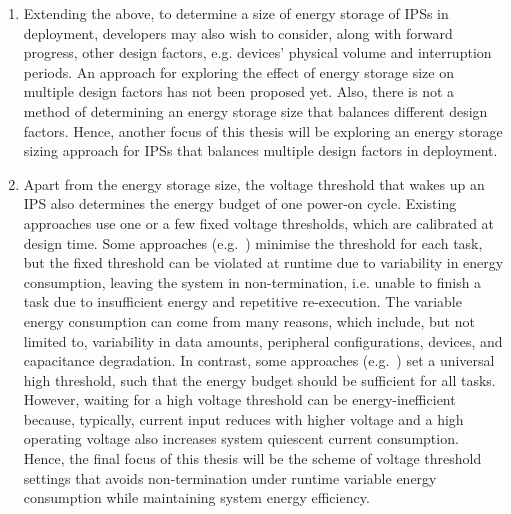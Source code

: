 \begin{enumerate}
\item 
Extending the above, to determine a size of energy storage of IPSs in deployment, developers may also wish to consider, along with forward progress, other design factors, e.g. devices' physical volume and interruption periods. 
An approach for exploring the effect of energy storage size on multiple design factors has not been proposed yet. 
Also, there is not a method of determining an energy storage size that balances different design factors. 
Hence, another focus of this thesis will be exploring an energy storage sizing approach for IPSs that balances multiple design factors in deployment.  

\item 
Apart from the energy storage size, the voltage threshold that wakes up an IPS also determines the energy budget of one power-on cycle. 
Existing approaches use one or a few fixed voltage thresholds, which are calibrated at design time. 
Some approaches (e.g.~\cite{gomez2016dynamic}) minimise the threshold for each task, but the fixed threshold can be violated at runtime due to variability in energy consumption, leaving the system in non-termination, i.e. unable to finish a task due to insufficient energy and repetitive re-execution. 
The variable energy consumption can come from many reasons, which include, but not limited to, variability in data amounts, peripheral configurations, devices, and capacitance degradation. 
In contrast, some approaches (e.g.~\cite{maeng2019supporting}) set a universal high threshold, such that the energy budget should be sufficient for all tasks. 
However, waiting for a high voltage threshold can be energy-inefficient because, typically, current input reduces with higher voltage and a high operating voltage also increases system quiescent current consumption. 
Hence, the final focus of this thesis will be the scheme of voltage threshold settings that avoids non-termination under runtime variable energy consumption while maintaining system energy efficiency. 

\end{enumerate}

